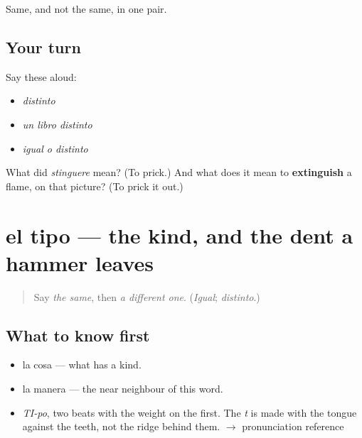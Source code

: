 \begin{grammarlens}[title={What you've built}]
Same, and not the same, in one pair.
\end{grammarlens}

\subsection*{Your turn}
Say these aloud:

\begin{itemize}
\raggedright
  \item \emph{distinto}
  \item \emph{un libro distinto}
  \item \emph{igual o distinto}
\end{itemize}

\begin{tcolorbox}[breakable,colback=teal!4,colframe=teal!35!black,title={Before you move on}]
What did \emph{stinguere} mean? (To prick.) And what does it mean to \textbf{extinguish} a flame, on that picture? (To prick it out.)
\end{tcolorbox}
\section[el tipo]{el tipo — the kind, and the dent a hammer leaves}

\label{lesson:ES-C350-tipo}



\begin{quote}
Say \emph{the same}, then \emph{a different one}. (\emph{Igual}; \emph{distinto}.)
\end{quote}

\subsection*{What to know first}
\begin{itemize}
\raggedright
  \item la cosa — what has a kind.
  \item la manera — the near neighbour of this word.
\end{itemize}

\begin{sounds}
\begin{itemize}
\raggedright
  \item \emph{TI-po}, two beats with the weight on the first. The \emph{t} is made with the tongue against the teeth, not the ridge behind them. $\to$ pronunciation reference
\end{itemize}
\end{sounds}

